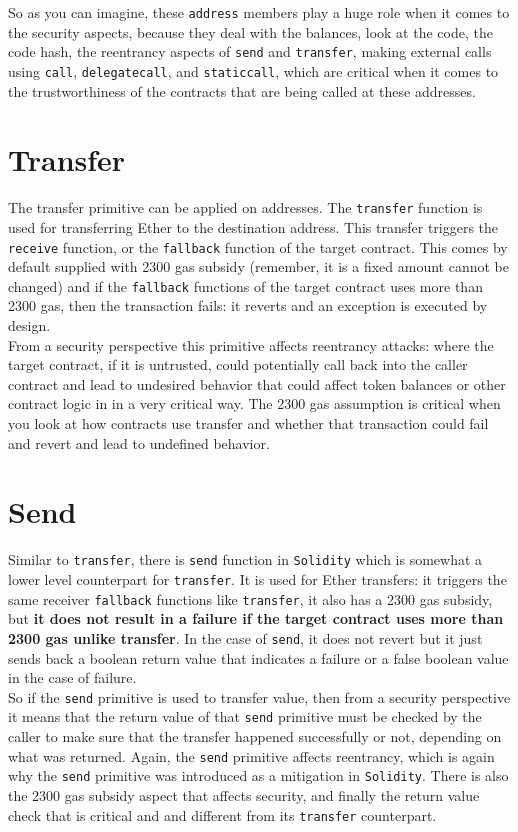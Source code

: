 So as you can imagine, these \texttt{address} members play a huge role when it comes to the security aspects, because they deal with the balances, look at the code, the code hash, the reentrancy aspects of \texttt{send} and \texttt{transfer}, making external calls using \texttt{call}, \texttt{delegatecall}, and \texttt{staticcall}, which are critical when it comes to the trustworthiness of the contracts that are being called at these addresses.

\section{Transfer}
The transfer primitive can be applied on addresses. The \texttt{transfer} function is used for transferring Ether to the destination address. This transfer triggers the \texttt{receive} function, or the \texttt{fallback} function of the target contract. This comes by default supplied with 2300 gas subsidy (remember, it is a fixed amount cannot be changed) and if the \texttt{fallback} functions of the target contract uses more than 2300 gas, then the transaction fails: it reverts and an exception is executed by design.\\

From a security perspective this primitive affects reentrancy attacks: where the target contract, if it is untrusted, could potentially call back into the caller contract and lead to undesired behavior that could affect token balances or other contract logic in in a very critical way. The 2300 gas assumption is critical when you look at how contracts use transfer and whether that transaction could fail and revert and lead to undefined behavior.

\section{Send}
Similar to \texttt{transfer}, there is \texttt{send} function in \texttt{Solidity} which is somewhat a lower level counterpart for \texttt{transfer}. It is used for Ether transfers: it triggers the same receiver \texttt{fallback} functions like \texttt{transfer}, it also has a 2300 gas subsidy, but \textbf{it does not result in a failure if the target contract uses more than 2300 gas unlike transfer}. In the case of \texttt{send}, it does not revert but it just sends back a boolean return value that indicates a failure or a false boolean value in the case of failure.\\

So if the \texttt{send} primitive is used to transfer value, then from a security perspective it means that the return value of that \texttt{send} primitive must be checked by the caller to make sure that the transfer happened successfully or not, depending on what was returned. Again, the \texttt{send} primitive affects reentrancy, which is again why the \texttt{send} primitive was introduced as a mitigation in \texttt{Solidity}. There is also the 2300 gas subsidy aspect that affects security, and finally the return value check that is critical and and different from its \texttt{transfer} counterpart.

